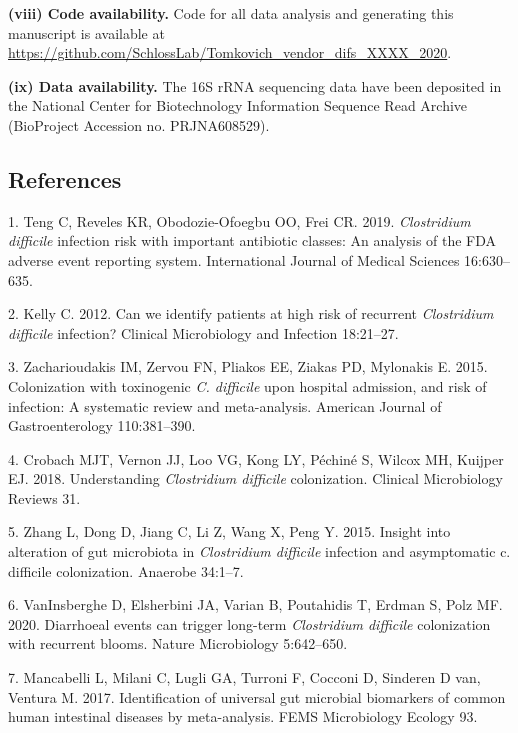 \documentclass[11pt,]{article}
\begin{document}
\textbf{(viii) Code availability.} Code for all data analysis and
generating this manuscript is available at
\url{https://github.com/SchlossLab/Tomkovich_vendor_difs_XXXX_2020}.

\textbf{(ix) Data availability.} The 16S rRNA sequencing data have been
deposited in the National Center for Biotechnology Information Sequence
Read Archive (BioProject Accession no. PRJNA608529).

\newpage

\subsection{References}\label{references}

\hypertarget{refs}{}
\hypertarget{ref-Teng2019}{}
1. Teng C, Reveles KR, Obodozie-Ofoegbu OO, Frei CR. 2019.
\emph{Clostridium difficile} infection risk with important antibiotic
classes: An analysis of the FDA adverse event reporting system.
International Journal of Medical Sciences 16:630--635.

\hypertarget{ref-Kelly2012}{}
2. Kelly C. 2012. Can we identify patients at high risk of recurrent
\emph{Clostridium difficile} infection? Clinical Microbiology and
Infection 18:21--27.

\hypertarget{ref-Zacharioudakis2015}{}
3. Zacharioudakis IM, Zervou FN, Pliakos EE, Ziakas PD, Mylonakis E.
2015. Colonization with toxinogenic \emph{C. difficile} upon hospital
admission, and risk of infection: A systematic review and meta-analysis.
American Journal of Gastroenterology 110:381--390.

\hypertarget{ref-Crobach2018}{}
4. Crobach MJT, Vernon JJ, Loo VG, Kong LY, Péchiné S, Wilcox MH,
Kuijper EJ. 2018. Understanding \emph{Clostridium difficile}
colonization. Clinical Microbiology Reviews 31.

\hypertarget{ref-Zhang2015}{}
5. Zhang L, Dong D, Jiang C, Li Z, Wang X, Peng Y. 2015. Insight into
alteration of gut microbiota in \emph{Clostridium difficile} infection
and asymptomatic c. difficile colonization. Anaerobe 34:1--7.

\hypertarget{ref-VanInsberghe2020}{}
6. VanInsberghe D, Elsherbini JA, Varian B, Poutahidis T, Erdman S, Polz
MF. 2020. Diarrhoeal events can trigger long-term \emph{Clostridium
difficile} colonization with recurrent blooms. Nature Microbiology
5:642--650.

\hypertarget{ref-Mancabelli2017}{}
7. Mancabelli L, Milani C, Lugli GA, Turroni F, Cocconi D, Sinderen D
van, Ventura M. 2017. Identification of universal gut microbial
biomarkers of common human intestinal diseases by meta-analysis. FEMS
Microbiology Ecology 93.
\end{document}
